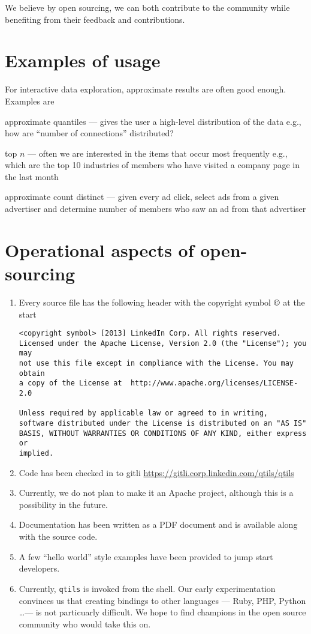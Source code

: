 \documentclass[letterpaper]{article}
\begin{document}
We believe by open sourcing, we can both contribute to the community
while benefiting from their feedback and contributions. 

\section{Examples of usage}

For interactive data exploration, approximate results are often good
enough. Examples are 
\be
\item approximate quantiles --- gives the user a high-level distribution
of the data e.g., how are ``number of connections'' distributed?
\item top \(n\) --- often we are interested in the items that occur most
frequently e.g., which are the top 10 industries of members who have
visited a company page in the last month
\item approximate count distinct --- given every ad click, select ads
from a given advertiser and determine number of members who saw an ad
from that advertiser
\ee

\section{Operational aspects of open-sourcing}

\begin{enumerate}
\item Every source file has the following header with the copyright
symbol \(\copyright\) at the start
\begin{verbatim}
<copyright symbol> [2013] LinkedIn Corp. All rights reserved.
Licensed under the Apache License, Version 2.0 (the "License"); you may
not use this file except in compliance with the License. You may obtain
a copy of the License at  http://www.apache.org/licenses/LICENSE-2.0
 
Unless required by applicable law or agreed to in writing,
software distributed under the License is distributed on an "AS IS"
BASIS, WITHOUT WARRANTIES OR CONDITIONS OF ANY KIND, either express or
implied.
\end{verbatim}
\item
Code has been checked in to gitli
\url{https://gitli.corp.linkedin.com/qtils/qtils}
\item Currently, we do not plan to make it an Apache project, although
this is a possibility in the future.
\item Documentation has been written as a PDF document and is available
along with the source code.
\item A few ``hello world'' style examples have been provided to jump
start developers.
\item Currently, {\tt qtils} is invoked from the shell. Our early
experimentation convinces us that creating bindings to other languages
--- Ruby, PHP, Python \ldots --- is not particuarly difficult. We hope
to find champions in the open source community who would take this on.
\end{enumerate}
\end{document}
